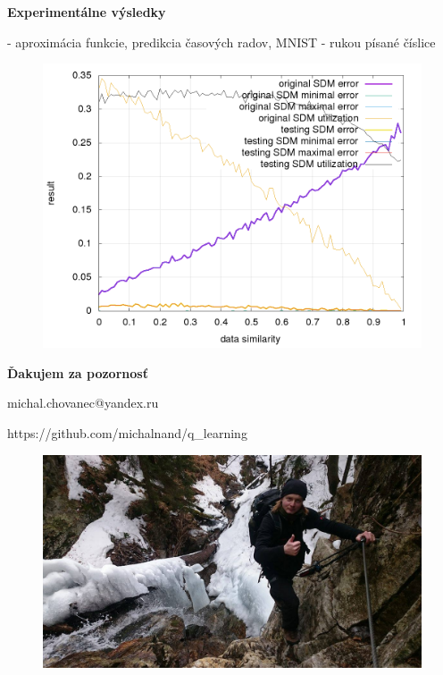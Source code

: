 \documentclass[xcolor=dvipsnames]{beamer}
\begin{document}
\begin{frame}{\bf Experimentálne výsledky}

- aproximácia funkcie, predikcia časových radov, MNIST - rukou písané číslice

\begin{figure}[!htb]
\includegraphics[scale=.35]{../pictures/aproximation_result_all.png}
\label{img:oroginal_sdm}
\end{figure}


\end{frame}


\begin{frame}{\bf Ďakujem za pozornosť}

\centerline{michal.chovanec@yandex.ru}
\centerline{https://github.com/michalnand/q\_learning}

\begin{figure}[!htb]
\centering
\includegraphics[scale=.25]{../pictures/me_ferrata.jpg}
\end{figure}



\end{frame}
\end{document}
